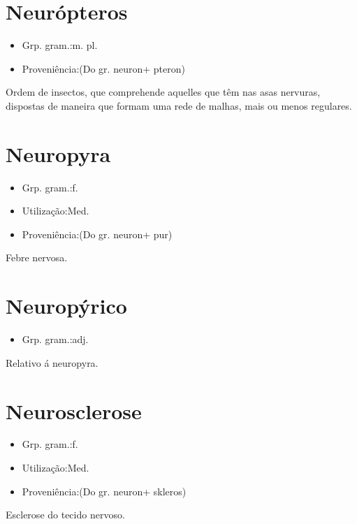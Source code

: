\section{Neurópteros}
\begin{itemize}
\item {Grp. gram.:m. pl.}
\end{itemize}
\begin{itemize}
\item {Proveniência:(Do gr. \textunderscore neuron\textunderscore  + \textunderscore pteron\textunderscore )}
\end{itemize}
Ordem de insectos, que comprehende aquelles que têm nas asas nervuras, dispostas de maneira que formam uma rede de malhas, mais ou menos regulares.
\section{Neuropyra}
\begin{itemize}
\item {Grp. gram.:f.}
\end{itemize}
\begin{itemize}
\item {Utilização:Med.}
\end{itemize}
\begin{itemize}
\item {Proveniência:(Do gr. \textunderscore neuron\textunderscore  + \textunderscore pur\textunderscore )}
\end{itemize}
Febre nervosa.
\section{Neuropýrico}
\begin{itemize}
\item {Grp. gram.:adj.}
\end{itemize}
Relativo á neuropyra.
\section{Neurosclerose}
\begin{itemize}
\item {Grp. gram.:f.}
\end{itemize}
\begin{itemize}
\item {Utilização:Med.}
\end{itemize}
\begin{itemize}
\item {Proveniência:(Do gr. \textunderscore neuron\textunderscore  + \textunderscore skleros\textunderscore )}
\end{itemize}
Esclerose do tecido nervoso.

